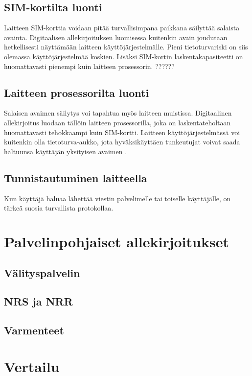 \documentclass[finnish]{tktltiki2}
\theoremstyle{definition}
\theoremstyle{remark}
\begin{document}
\subsection{SIM-kortilta luonti}

Laitteen SIM-korttia voidaan pitää turvallisimpana paikkana säilyttää salaista avainta. Digitaalisen allekirjoituksen luomisessa kuitenkin avain joudutaan hetkellisesti näyttämään laitteen käyttöjärjestelmälle. Pieni tietoturvariski on siis olemassa käyttöjärjestelmää koskien. Lisäksi SIM-kortin laskentakapasiteetti on huomattavasti pienempi kuin laitteen prosessorin. ?????? 

\subsection{Laitteen prosessorilta luonti}

Salaisen avaimen säilytys voi tapahtua myös laitteen muistissa. Digitaalinen allekirjoitus luodaan tällöin laitteen prosessorilla, joka on laskentateholtaan huomattavasti tehokkaampi kuin SIM-kortti. Laitteen käyttöjärjestelmässä voi kuitenkin olla tietoturva-aukko, jota hyväksikäyttäen tunkeutujat voivat saada haltuunsa käyttäjän yksityisen avaimen \cite{proxy}.

\subsection{Tunnistautuminen laitteella}
Kun käyttäjä haluaa lähettää viestin palvelimelle tai toiselle käyttäjälle, on tärkeä suosia turvallista protokollaa.

\section{Palvelinpohjaiset allekirjoitukset}
\subsection{Välityspalvelin}
\subsection{NRS ja NRR}
\subsection{Varmenteet}

\section{Vertailu}
\end{document}
